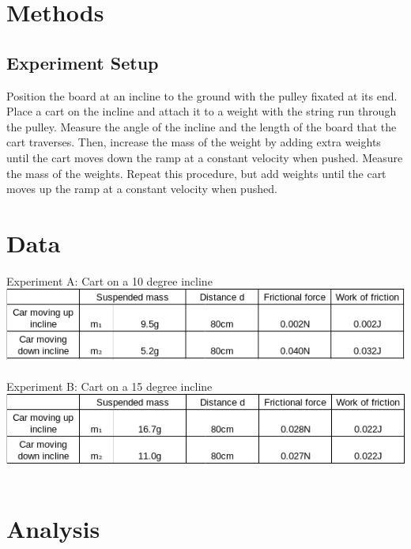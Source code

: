 \documentclass[12pt]{article}
\begin{document}
    \section{Methods}
        \subsection{Experiment Setup}
            Position the board at an incline to the ground with the pulley
            fixated at its end. Place a cart on the incline and attach it to a
            weight with the string run through the pulley. Measure the angle
            of the incline and the length of the board that the cart traverses.
            Then, increase the mass of the weight by adding extra weights until
            the cart moves down the ramp at a constant velocity when pushed.
            Measure the mass of the weights. Repeat this procedure, but add
            weights until the cart moves up the ramp at a constant velocity
            when pushed.
    \section{Data}
        {\large Experiment A: Cart on a 10 degree incline} \\
        \includegraphics[scale=0.75 ]{Chart10deg.png} \\ \\
        {\large Experiment B: Cart on a 15 degree incline} \\
        \includegraphics[scale=0.75 ]{Chart15deg.png} \\ \\

    \section{Analysis}
\end{document}
